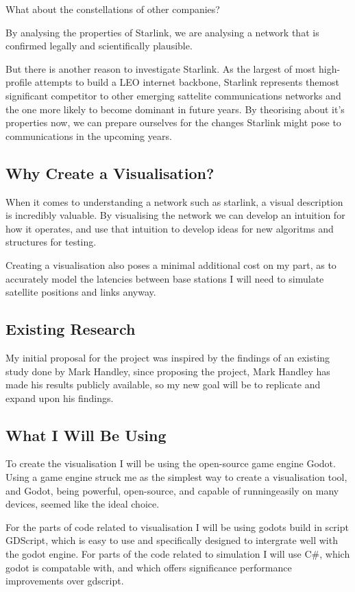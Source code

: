 \documentclass[12pt]{article}
\begin{document}
What about the constellations of other companies? %

By analysing the properties of Starlink, we are analysing a network that is confirmed legally and scientifically plausible.

But there is another reason to investigate Starlink. As the largest of most high-profile attempts to build a LEO internet backbone, Starlink represents themost significant competitor to other emerging sattelite communications networks and the one more likely to become dominant in future years. By theorising about it's properties now, we can prepare ourselves for the changes Starlink might pose to communications in the upcoming years.

\subsection{Why Create a Visualisation?}
When it comes to understanding a network such as starlink, a visual description is incredibly valuable. By visualising the network we can develop an intuition for how it operates, and use that intuition to develop ideas for new algoritms and structures for testing.

Creating a visualisation also poses a minimal additional cost on my part, as to accurately model the latencies between base stations I will need to simulate satellite positions and links anyway.

\subsection{Existing Research}

My initial proposal for the project was inspired by the findings of an existing study done  by Mark Handley, since proposing the project, Mark Handley has made his results publicly available\cite{OriginalReport}, so my new goal will be to replicate and expand upon his findings.

\subsection{What I Will Be Using}
To create the visualisation I will be using the open-source game engine Godot. Using a game engine struck me as the simplest way to create a visualisation tool, and Godot, being powerful, open-source, and capable of runningeasily on many devices, seemed like the ideal choice.

For the parts of code related to visualisation I will be using godots build in script GDScript, which is easy to use and specifically designed to intergrate well with the godot engine. For parts of the code related to simulation I will use C\#, which godot is compatable with, and which offers significance performance improvements over gdscript.
\end{document}

